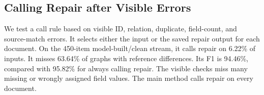 \subsection{Calling Repair after Visible Errors}
\label{app:call_policy}

We test a call rule based on visible ID, relation, duplicate, field-count,
and source-match errors. It selects either the input or the saved repair
output for each document. On the 450-item model-built/clean stream,
it calls repair on 6.22\% of inputs. It misses 63.64\% of graphs with
reference differences. Its F1 is 94.46\%, compared with 95.82\% for
always calling repair. The visible checks miss many missing or wrongly
assigned field values. The main method calls repair on every document.
